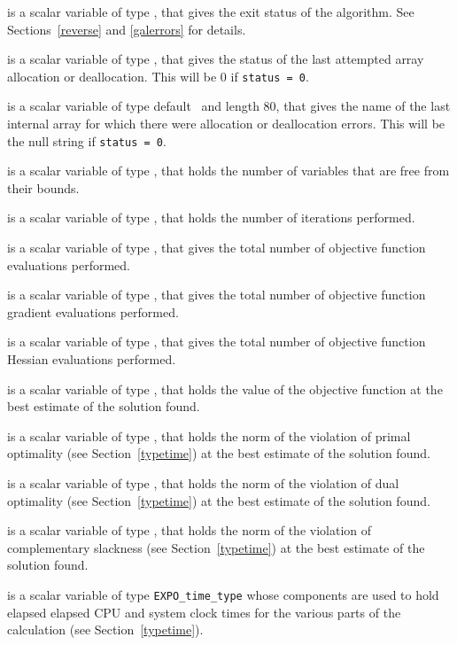 \documentclass{galahad}
\newcommand{\packagename}{EXPO}
\begin{document}
\begin{description}
 is a scalar variable of type \integer, that gives the
exit status of the algorithm.
See Sections~\ref{reverse} and \ref{galerrors}
for details.

 is a scalar variable of type \integer, that gives
the status of the last attempted array allocation or deallocation.
This will be 0 if {\tt status = 0}.

 is a scalar variable of type default \character\
and length 80, that  gives the name of the last internal array
for which there were allocation or deallocation errors.
This will be the null string if {\tt status = 0}.

 is a scalar variable of type \integer, that holds the
number of variables that are free from their bounds.

 is a scalar variable of type \integer, that holds the
number of iterations performed.

 is a scalar variable of type \integer, that gives the
total number of objective function evaluations performed.

 is a scalar variable of type \integer, that gives the
total number of objective function gradient evaluations performed.

 is a scalar variable of type \integer, that gives the
total number of objective function Hessian evaluations performed.

 is a scalar variable of type \realdp, that holds the
value of the objective function at the best estimate of the solution found.

 is a scalar variable of type \realdp,
that holds the norm of the violation of primal optimality
(see Section~\ref{typetime}) at the best estimate of the solution found.

 is a scalar variable of type \realdp,
that holds the norm of the violation of dual optimality
(see Section~\ref{typetime}) at the best estimate of the solution found.

is a scalar variable of type \realdp,
that holds the norm of the violation of complementary slackness
(see Section~\ref{typetime}) at the best estimate of the solution found.

 is a scalar variable of type {\tt \packagename\_time\_type}
whose components are used to hold elapsed elapsed CPU and system clock
times for the various parts of the calculation (see Section~\ref{typetime}).


\end{description}
\end{document}

